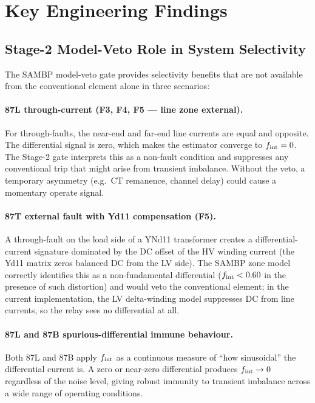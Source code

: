 \documentclass[12pt,a4paper]{article}
\newcommand{\fint}{f_{\rm int}}
\begin{document}
\section{Key Engineering Findings}

\subsection{Stage-2 Model-Veto Role in System Selectivity}

The SAMBP model-veto gate provides selectivity benefits that are not
available from the conventional element alone in three scenarios:

\paragraph{87L through-current (F3, F4, F5 — line zone external).}
For through-faults, the near-end and far-end line currents are equal
and opposite.  The differential signal is zero, which makes the
estimator converge to $\fint = 0$.  The Stage-2 gate interprets this
as a non-fault condition and suppresses any conventional trip that might
arise from transient imbalance.  Without the veto, a temporary
asymmetry (e.g.\ CT remanence, channel delay) could cause a momentary
operate signal.

\paragraph{87T external fault with Yd11 compensation (F5).}
A through-fault on the load side of a YNd11 transformer creates a
differential-current signature dominated by the DC offset of the HV
winding current (the Yd11 matrix zeros balanced DC from the LV side).
The SAMBP zone model correctly identifies this as a non-fundamental
differential ($\fint < 0.60$ in the presence of such distortion) and
would veto the conventional element; in the current implementation, the
LV delta-winding model suppresses DC from line currents, so the relay
sees no differential at all.

\paragraph{87L and 87B spurious-differential immune behaviour.}
Both 87L and 87B apply $\fint$ as a continuous measure of ``how
sinusoidal'' the differential current is.  A zero or near-zero
differential produces $\fint \to 0$ regardless of the noise level,
giving robust immunity to transient imbalance across a wide range of
operating conditions.
\end{document}
